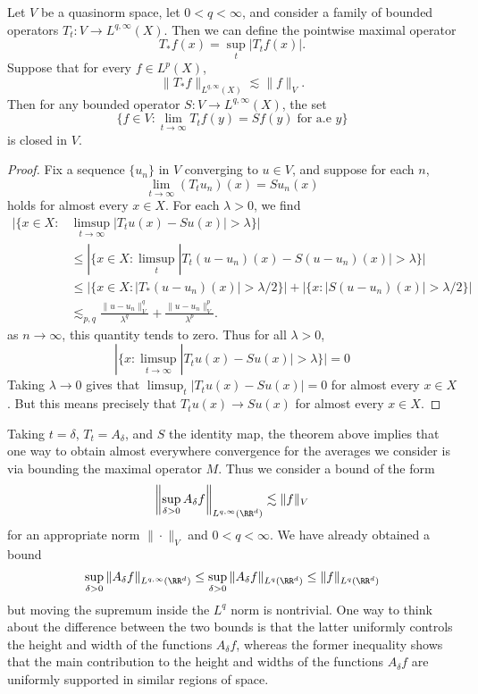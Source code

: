 \begin{theorem}
  Let $V$ be a quasinorm space, let $0 < q < \infty$, and consider a family of bounded operators $T_t: V \to L^{q,\infty}(X)$. Then we can define the pointwise maximal operator
  \[ T_* f(x) = \sup_t |T_t f(x)|. \]
  Suppose that for every $f \in L^p(X)$,
  \[ \| T_* f \|_{L^{q,\infty}(X)} \lesssim \| f \|_V. \]
  Then for any bounded operator $S: V \to L^{q,\infty}(X)$, the set
  \[ \{ f \in V : \lim_{t \to \infty} T_t f(y) = Sf(y)\; \text{for a.e $y$} \} \]
  is closed in $V$.
\end{theorem}
\begin{proof}
  Fix a sequence $\{ u_n \}$ in $V$ converging to $u \in V$, and suppose for each $n$,
  \[ \lim_{t \to \infty} (T_t u_n)(x) = Su_n(x) \]
  holds for almost every $x \in X$. For each $\lambda > 0$, we find
  \begin{align*}
    |\{ x \in X: &\limsup_{t \to \infty} |T_t u(x) - Su(x)| > \lambda \}|\\
    &\leq |\{ x \in X: \limsup_t |T_t(u - u_n)(x) - S(u - u_n)(x)| > \lambda \}|\\
    &\leq |\{ x \in X : |T_*(u - u_n)(x)| > \lambda/2 \}| + | \{ x: |S(u - u_n)(x)| > \lambda/2 \} |\\
    &\lesssim_{p,q} \frac{\| u - u_n \|_V^q}{\lambda^q} + \frac{\| u - u_n \|_V^p}{\lambda^p}.
  \end{align*}
  as $n \to \infty$, this quantity tends to zero. Thus for all $\lambda > 0$,
  \[ |\{ x: \limsup_{t \to \infty} |T_t u(x) - Su(x)| > \lambda \}| = 0 \]
  Taking $\lambda \to 0$ gives that $\limsup_t |T_t u(x) - Su(x)| = 0$ for almost every $x \in X$. But this means precisely that $T_tu(x) \to Su(x)$ for almost every $x \in X$.
\end{proof}

Taking $t = \delta$, $T_t = A_\delta$, and $S$ the identity map, the theorem above implies that one way to obtain almost everywhere convergence for the averages we consider is via bounding the maximal operator $M$. Thus we consider a bound of the form
%
\[ \left\| \sup_{\delta > 0} A_\delta f \right\|_{L^{q,\infty}(\RR^d)} \lesssim \| f \|_V \]
%
for an appropriate norm $\| \cdot \|_V$ and $0 < q < \infty$. We have already obtained a bound
%
\[ \sup_{\delta > 0} \| A_\delta f \|_{L^{q,\infty}(\RR^d)} \leq \sup_{\delta > 0} \| A_\delta f \|_{L^q(\RR^d)} \leq \| f \|_{L^q(\RR^d)} \]
%
but moving the supremum inside the $L^q$ norm is nontrivial. One way to think about the difference between the two bounds is that the latter uniformly controls the height and width of the functions $A_\delta f$, whereas the former inequality shows that the main contribution to the height and widths of the functions $A_\delta f$ are uniformly supported in similar regions of space.

